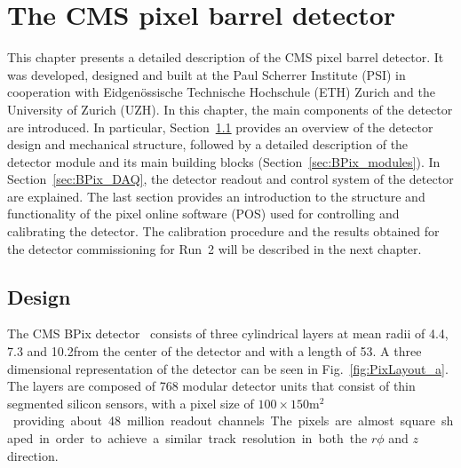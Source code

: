 \chapter{The CMS pixel barrel detector}
\label{ch:BPix}

This chapter presents a detailed description of the CMS pixel barrel detector.
It was developed, designed and built at the Paul Scherrer Institute (PSI) in cooperation with Eidgen{\"o}ssische Technische Hochschule (ETH) Zurich and the University of Zurich (UZH).
In this chapter, the main components of the detector are introduced. In particular, Section~\ref{sec:BPix_design} provides an overview of the detector design and mechanical structure, followed by a detailed description of the detector module and its main building blocks (Section~\ref{sec:BPix_modules}). In Section~\ref{sec:BPix_DAQ}, the detector readout and control system of the detector are explained.
The last section provides an introduction to the structure and functionality of the pixel online software (POS) used for controlling and calibrating the detector.
The calibration procedure and the results obtained for the detector commissioning for Run~2 will be described in the next chapter.

\section{Design}\label{sec:BPix_design}

The CMS BPix detector~\cite{Kastli2007724} consists of three cylindrical layers at mean radii of 4.4, 7.3 and 10.2\cm from the center of the detector and with a length of 53\cm.
A three dimensional representation of the detector can be seen in Fig.~\ref{fig:PixLayout_a}.
The layers are composed of 768 modular detector units that consist of thin segmented silicon sensors, with a pixel size of $100\times150$\unit{m$^2$} providing about 48 million readout channels.
The pixels are almost square shaped in order to achieve a similar track resolution in both the $r\phi$ and $z$ direction.

